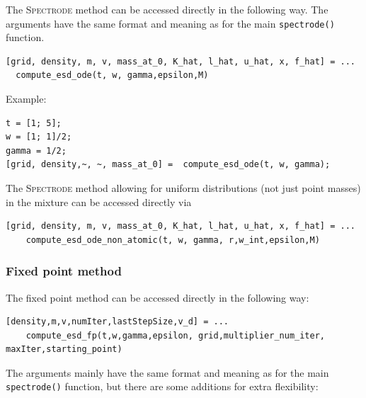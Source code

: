 \documentclass[english,11pt]{article} %
\begin{document}
\subsubsection{}

The \textsc{Spectrode} method can be accessed directly in the following way. The arguments have the same format and meaning as for the main \verb+spectrode()+ function. 

\begin{verbatim}
[grid, density, m, v, mass_at_0, K_hat, l_hat, u_hat, x, f_hat] = ...
  compute_esd_ode(t, w, gamma,epsilon,M)
\end{verbatim}

Example:

\begin{verbatim}
t = [1; 5]; 
w = [1; 1]/2;
gamma = 1/2; 
[grid, density,~, ~, mass_at_0] =  compute_esd_ode(t, w, gamma);
\end{verbatim}

The \textsc{Spectrode} method allowing for uniform distributions (not just point masses) in the mixture can be accessed directly via

\begin{verbatim}
[grid, density, m, v, mass_at_0, K_hat, l_hat, u_hat, x, f_hat] = ...
    compute_esd_ode_non_atomic(t, w, gamma, r,w_int,epsilon,M)
\end{verbatim}


\subsubsection{Fixed point method}

The fixed point method can be accessed directly in the following way: 

\begin{verbatim}
[density,m,v,numIter,lastStepSize,v_d] = ...
    compute_esd_fp(t,w,gamma,epsilon, grid,multiplier_num_iter, maxIter,starting_point)
\end{verbatim}

 The arguments mainly have the same format and meaning as for the main \verb+spectrode()+ function, but there are some additions for extra flexibility:  
 
\end{document}
